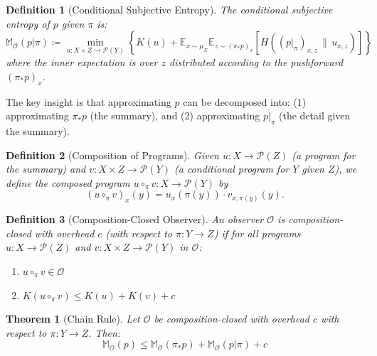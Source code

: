 \documentclass[11pt]{article}
\newtheorem{definition}{Definition}
\newtheorem{theorem}{Theorem}
\begin{document}
\begin{definition}[Conditional Subjective Entropy]
The conditional subjective entropy of $p$ given $\pi$ is:
\[ \mathbb{M}_\mathcal{O}(p|\pi) \coloneqq \min_{u: X \times Z \to \mathcal{P}(Y)} \left\{ K(u) + \mathbb{E}_{x \sim \mu_X} \mathbb{E}_{z \sim (\pi_* p)_x} \left[ H((p|_\pi)_{x,z} \,\|\, u_{x,z}) \right] \right\} \]
where the inner expectation is over $z$ distributed according to the pushforward $(\pi_* p)_x$.
\end{definition}

The key insight is that approximating $p$ can be decomposed into: (1) approximating $\pi_* p$ (the summary), and (2) approximating $p|_\pi$ (the detail given the summary).

\begin{definition}[Composition of Programs]
Given $u: X \to \mathcal{P}(Z)$ (a program for the summary) and $v: X \times Z \to \mathcal{P}(Y)$ (a conditional program for $Y$ given $Z$), we define the composed program $u \circ_\pi v: X \to \mathcal{P}(Y)$ by
\[ (u \circ_\pi v)_x(y) = u_x(\pi(y)) \cdot v_{x,\pi(y)}(y). \]
\end{definition}

\begin{definition}[Composition-Closed Observer]
An observer $\mathcal{O}$ is \emph{composition-closed with overhead $c$} (with respect to $\pi: Y \to Z$) if for all programs $u: X \to \mathcal{P}(Z)$ and $v: X \times Z \to \mathcal{P}(Y)$ in $\mathcal{O}$:
\begin{enumerate}
    \item $u \circ_\pi v \in \mathcal{O}$
    \item $K(u \circ_\pi v) \leq K(u) + K(v) + c$
\end{enumerate}
\end{definition}

\begin{theorem}[Chain Rule]\label{thm:chainrule}
Let $\mathcal{O}$ be composition-closed with overhead $c$ with respect to $\pi: Y \to Z$. Then:
\[ \mathbb{M}_\mathcal{O}(p) \leq \mathbb{M}_\mathcal{O}(\pi_* p) + \mathbb{M}_\mathcal{O}(p|\pi) + c \]
\end{theorem}
\end{document}

